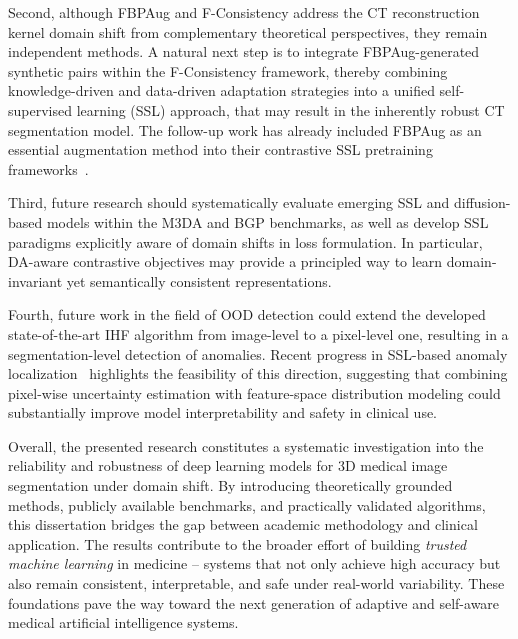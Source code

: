 Second, although FBPAug and F-Consistency address the CT reconstruction kernel domain shift from complementary theoretical perspectives, they remain independent methods. A natural next step is to integrate FBPAug-generated synthetic pairs within the F-Consistency framework, thereby combining knowledge-driven and data-driven adaptation strategies into a unified self-supervised learning (SSL) approach, that may result in the inherently robust CT segmentation model. The follow-up work has already included FBPAug as an essential augmentation method into their contrastive SSL pretraining frameworks~\cite{goncharov2023vox2vec,goncharov2024anatomical}.

Third, future research should systematically evaluate emerging SSL and diffusion-based models within the M3DA and BGP benchmarks, as well as develop SSL paradigms explicitly aware of domain shifts in loss formulation. In particular, DA-aware contrastive objectives may provide a principled way to learn domain-invariant yet semantically consistent representations.

Fourth, future work in the field of OOD detection could extend the developed state-of-the-art IHF algorithm from image-level to a pixel-level one, resulting in a segmentation-level detection of anomalies. Recent progress in SSL-based anomaly localization~\cite{goncharov2025screener} highlights the feasibility of this direction, suggesting that combining pixel-wise uncertainty estimation with feature-space distribution modeling could substantially improve model interpretability and safety in clinical use. 

Overall, the presented research constitutes a systematic investigation into the reliability and robustness of deep learning models for 3D medical image segmentation under domain shift. By introducing theoretically grounded methods, publicly available benchmarks, and practically validated algorithms, this dissertation bridges the gap between academic methodology and clinical application. The results contribute to the broader effort of building \textit{trusted machine learning} in medicine -- systems that not only achieve high accuracy but also remain consistent, interpretable, and safe under real-world variability. These foundations pave the way toward the next generation of adaptive and self-aware medical artificial intelligence systems.